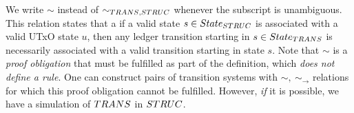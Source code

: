 

We write $\sim$ instead of $\sim_{\TRANS,\STRUC}$ whenever the subscript is
unambiguous. This relation states that a if a valid state $s \in \State_{\STRUC}$ is
associated with a valid UTxO state $u$, then any ledger transition starting in
$s \in \State_{\TRANS}$ is necessarily associated with a valid transition starting
in state $s$. Note that $\sim$ is a \emph{proof obligation} that must be
fulfilled as part of the definition, which \emph{does not define a rule}.
One can construct pairs of transition
systems with $\sim,~\sim_{\to}$ relations for which this proof obligation cannot
be fulfilled. However, \emph{if} it is possible, we have a simulation of $\TRANS$
in $\STRUC$.



